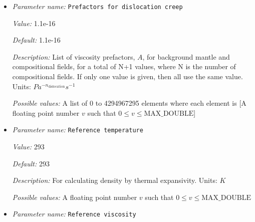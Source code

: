 \begin{itemize}
{\it Value:} 1.5e-15


{\it Default:} 1.5e-15


{\it Description:} List of viscosity prefactors, $A$, for background mantle and compositional fields, for a total of N+1 values, where N is the number of compositional fields. If only one value is given, then all use the same value. Units: $Pa^{-1} m^{m_{\text{diffusion}}} s^{-1}$


{\it Possible values:} A list of 0 to 4294967295 elements where each element is [A floating point number $v$ such that $0 \leq v \leq \text{MAX\_DOUBLE}$]
\item {\it Parameter name:} {\tt Prefactors for dislocation creep}
\label{parameters:Material model/Diffusion dislocation/Prefactors for dislocation creep}


{\it Value:} 1.1e-16


{\it Default:} 1.1e-16


{\it Description:} List of viscosity prefactors, $A$, for background mantle and compositional fields, for a total of N+1 values, where N is the number of compositional fields. If only one value is given, then all use the same value. Units: $Pa^{-n_{\text{dislocation}}} s^{-1}$


{\it Possible values:} A list of 0 to 4294967295 elements where each element is [A floating point number $v$ such that $0 \leq v \leq \text{MAX\_DOUBLE}$]
\item {\it Parameter name:} {\tt Reference temperature}
\label{parameters:Material model/Diffusion dislocation/Reference temperature}


{\it Value:} 293


{\it Default:} 293


{\it Description:} For calculating density by thermal expansivity. Units: $K$


{\it Possible values:} A floating point number $v$ such that $0 \leq v \leq \text{MAX\_DOUBLE}$
\item {\it Parameter name:} {\tt Reference viscosity}
\label{parameters:Material model/Diffusion dislocation/Reference viscosity}



\end{itemize}

